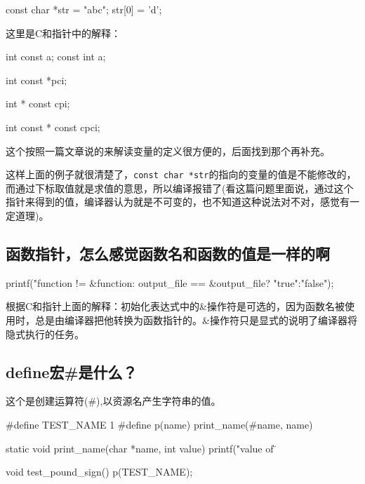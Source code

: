 \begin{C}[为什么这样会有编译错误呢？]
const char *str = "abc";
str[0] = 'd';
\end{C}

这里是C和指针中的解释：

\begin{C}
int const a;
const int a;
\end{C}


\begin{C}
int const *pci;
\end{C}

\begin{C}
int * const cpi;
\end{C}

\begin{C}[这个指针和值都不能修改]
int const * const cpci;
\end{C}

这个按照一篇文章说的来解读变量的定义很方便的，后面找到那个再补充。


这样上面的例子就很清楚了，\lstinline$const char *str$的指向的变量的值是不能修改的，而通过下标取值就是求值的意思，所以编译报错了(看这篇问题里面说，通过这个指针来得到的值，编译器认为就是不可变的，也不知道这种说法对不对，感觉有一定道理)。

\subsection{函数指针，怎么感觉函数名和函数的值是一样的啊}

\begin{C}[这是我不能理解的]
printf("function != &function:%
	output_file == &output_file? "true":"false");
\end{C}

根据C和指针上面的解释：初始化表达式中的\&操作符是可选的，因为函数名被使用时，总是由编译器把他转换为函数指针的。\&操作符只是显式的说明了编译器将隐式执行的任务。

\subsection{define宏\#是什么？}

这个是创建运算符(\#),以资源名产生字符串的值。

\begin{C}
#define TEST_NAME 1
#define p(name) print_name(#name, name)

static void print_name(char *name, int value)
{
	printf("value of \"%
}

void test_pound_sign()
{
	p(TEST_NAME);
}
\end{C}

